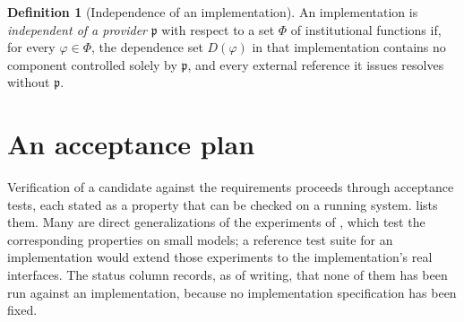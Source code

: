 \documentclass[11pt,twoside,openright]{book}
\theoremstyle{plain}
\theoremstyle{definition}
\newtheorem{definition}[theorem]{Definition}
\theoremstyle{remark}
\begin{document}
\begin{definition}[Independence of an implementation]\label{def:independence}
An implementation is \emph{independent of a provider} $\mathfrak{p}$ with respect to a set $\Phi$ of institutional functions if, for every $\varphi\in\Phi$, the dependence set $D(\varphi)$ in that implementation contains no component controlled solely by $\mathfrak{p}$, and every external reference it issues resolves without $\mathfrak{p}$.
\end{definition}

\section{An acceptance plan}

Verification of a candidate against the requirements proceeds through acceptance tests, each stated as a property that can be checked on a running system.  lists them. Many are direct generalizations of the experiments of , which test the corresponding properties on small models; a reference test suite for an implementation would extend those experiments to the implementation's real interfaces. The status column records, as of writing, that none of them has been run against an implementation, because no implementation specification has been fixed.
\end{document}
